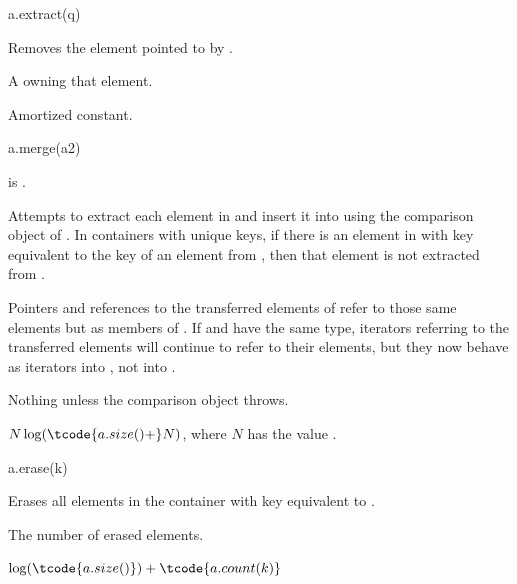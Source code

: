 %
\begin{itemdecl}
a.extract(q)
\end{itemdecl}

\begin{itemdescr}
\pnum
\result
{}

\pnum
\effects
Removes the element pointed to by .

\pnum
\returns
A  owning that element.

\pnum
\complexity
Amortized constant.
\end{itemdescr}

%
\begin{itemdecl}
a.merge(a2)
\end{itemdecl}

\begin{itemdescr}
\pnum
\result
{}

\pnum
\expects
{} is .

\pnum
\effects
Attempts to extract each element in  and insert it into 
using the comparison object of .
In containers with unique keys,
if there is an element in  with key equivalent to
the key of an element from ,
then that element is not extracted from .

\pnum
\ensures
Pointers and references to the transferred elements of 
refer to those same elements but as members of .
If  and  have the same type,
iterators referring to the transferred elements
will continue to refer to their elements,
but they now behave as iterators into , not into .

\pnum
\throws
Nothing unless the comparison object throws.

\pnum
\complexity
$N \log(\tcode{a.size()+} N)$, where $N$ has the value .
\end{itemdescr}

%
\begin{itemdecl}
a.erase(k)
\end{itemdecl}

\begin{itemdescr}
\pnum
\result
{}

\pnum
\effects
Erases all elements in the container with key equivalent to .

\pnum
\returns
The number of erased elements.

\pnum
\complexity
$\log (\tcode{a.size()}) + \tcode{a.count(k)}$
\end{itemdescr}

